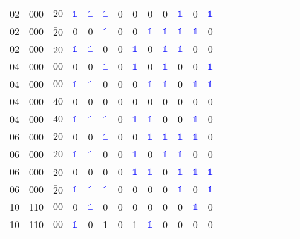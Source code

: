 \begin{longtable*}{c| cccccccccccccccccccc }
02& 000& $20$& \textcolor{blue}{$\mathds{1}$}& \textcolor{blue}{$\mathds{1}$}& \textcolor{blue}{$\mathds{1}$}& 0& 0& 0& 0& \textcolor{blue}{$\mathds{1}$}& 0& \textcolor{blue}{$\mathds{1}$}\\
02& 000& $\bar{2}0$& 0& 0& \textcolor{blue}{$\mathds{1}$}& 0& 0& \textcolor{blue}{$\mathds{1}$}& \textcolor{blue}{$\mathds{1}$}& \textcolor{blue}{$\mathds{1}$}& \textcolor{blue}{$\mathds{1}$}& 0\\
02& 000& $\bar{2}0$& \textcolor{blue}{$\mathds{1}$}& \textcolor{blue}{$\mathds{1}$}& 0& 0& \textcolor{blue}{$\mathds{1}$}& 0& \textcolor{blue}{$\mathds{1}$}& \textcolor{blue}{$\mathds{1}$}& 0& 0\\
04& 000& $00$& 0& 0& \textcolor{blue}{$\mathds{1}$}& 0& \textcolor{blue}{$\mathds{1}$}& 0& \textcolor{blue}{$\mathds{1}$}& 0& 0& \textcolor{blue}{$\mathds{1}$}\\
04& 000& $00$& \textcolor{blue}{$\mathds{1}$}& \textcolor{blue}{$\mathds{1}$}& 0& 0& 0& \textcolor{blue}{$\mathds{1}$}& \textcolor{blue}{$\mathds{1}$}& 0& \textcolor{blue}{$\mathds{1}$}& \textcolor{blue}{$\mathds{1}$}\\
04& 000& $40$& 0& 0& 0& 0& 0& 0& 0& 0& 0& 0\\
04& 000& $40$& \textcolor{blue}{$\mathds{1}$}& \textcolor{blue}{$\mathds{1}$}& \textcolor{blue}{$\mathds{1}$}& 0& \textcolor{blue}{$\mathds{1}$}& \textcolor{blue}{$\mathds{1}$}& 0& 0& \textcolor{blue}{$\mathds{1}$}& 0\\
06& 000& $20$& 0& 0& \textcolor{blue}{$\mathds{1}$}& 0& 0& \textcolor{blue}{$\mathds{1}$}& \textcolor{blue}{$\mathds{1}$}& \textcolor{blue}{$\mathds{1}$}& \textcolor{blue}{$\mathds{1}$}& 0\\
06& 000& $20$& \textcolor{blue}{$\mathds{1}$}& \textcolor{blue}{$\mathds{1}$}& 0& 0& \textcolor{blue}{$\mathds{1}$}& 0& \textcolor{blue}{$\mathds{1}$}& \textcolor{blue}{$\mathds{1}$}& 0& 0\\
06& 000& $\bar{2}0$& 0& 0& 0& 0& \textcolor{blue}{$\mathds{1}$}& \textcolor{blue}{$\mathds{1}$}& 0& \textcolor{blue}{$\mathds{1}$}& \textcolor{blue}{$\mathds{1}$}& \textcolor{blue}{$\mathds{1}$}\\
06& 000& $\bar{2}0$& \textcolor{blue}{$\mathds{1}$}& \textcolor{blue}{$\mathds{1}$}& \textcolor{blue}{$\mathds{1}$}& 0& 0& 0& 0& \textcolor{blue}{$\mathds{1}$}& 0& \textcolor{blue}{$\mathds{1}$}\\
10& 110& $00$& 0& \textcolor{blue}{$\mathds{1}$}& 0& 0& 0& 0& 0& 0& \textcolor{blue}{$\mathds{1}$}& 0\\
10& 110& $00$& \textcolor{blue}{$\mathds{1}$}& 0& 1& 0& 1& \textcolor{blue}{$\mathds{1}$}& 0& 0& 0& 0\\

\end{longtable*}
